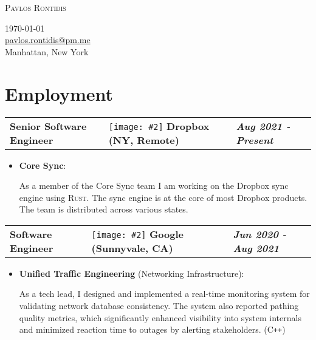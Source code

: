 \documentclass[a4paper,10pt]{article}
\newcommand*{\mahogany}{\textcolor{Mahogany}}
\newcommand{\jobtitle}[5]{
\vspace{0.1cm}
\begin{tabularx}
{\textwidth}
{ >{\raggedright\arraybackslash}p{6cm} 
  >{\raggedright\arraybackslash}X 
  >{\raggedleft\arraybackslash}p{4cm} }
\large\textbf{#1} & 
\texttt{[image: \#2]} \large\textbf{\mahogany{#3}} \normalsize\textbf{(#4)} & 
\textit{\large\textbf{#5}}
\end{tabularx}
\vspace{-0.4cm}
}
\begin{document}
\pagestyle{empty} %

\begin{minipage}{.45\linewidth}
\begin{flushleft}                           
\Huge \textsc{Pavlos Rontidis}
\end{flushleft} 
\end{minipage}
\hfill
\begin{minipage}{.45\linewidth}
\begin{flushright}   
\today\\
\href{mailto:pavlos.rontidis@pm.me}{pavlos.rontidis@pm.me}\\
Manhattan, New York
\end{flushright} 
\end{minipage}
\noindent\makebox[\linewidth]{\rule{\linewidth}{0.4pt}}

\section{Employment}
\jobtitle{Senior Software Engineer}{icons/dbx.png}{Dropbox}{NY, Remote}{Aug 2021 - Present}
\begin{itemize}[leftmargin=.27in,label=] \setlength\itemsep{-0.1cm}
	\item \textbf{Core Sync}:
    \vspace{-0.1cm}
    
    As a member of the Core Sync team I am working on the Dropbox sync engine using \textsc{Rust}. The sync engine is at the core of most Dropbox products. The team is distributed across various states.
\end{itemize}

\jobtitle{Software Engineer}{icons/google.png}{Google}{Sunnyvale, CA}{Jun 2020 - Aug 2021}
\begin{itemize}[leftmargin=.27in,label=] \setlength\itemsep{-0.1cm}
	\item \textbf{Unified Traffic Engineering} (Networking Infrastructure): 
	\vspace{-0.1cm}
	
    As a tech lead, I designed and implemented a real-time monitoring system for validating network database consistency. The system also reported pathing quality metrics, which significantly enhanced visibility into system internals and minimized reaction time to outages by alerting stakeholders. \textsc{(C\texttt{++})} 
\end{itemize}
\end{document}
